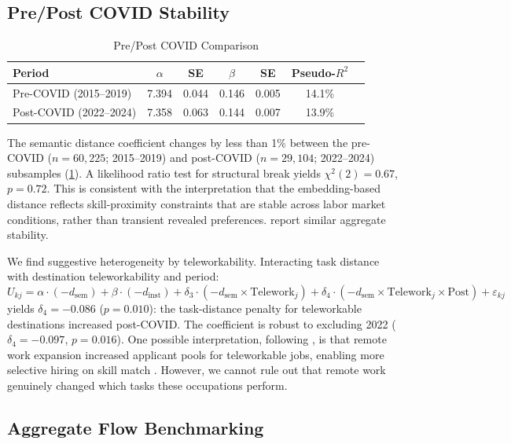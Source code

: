 \documentclass[12pt]{article}
\begin{document}
\subsection{Pre/Post COVID Stability}
\label{subsec:covid-stability}


\begin{table}[h!]
\centering
\caption{Pre/Post COVID Comparison}
\label{tab:covid-stability}
\begin{tabular}{lcccccc}
\toprule
\textbf{Period} & $\alpha$ & \textbf{SE} & $\beta$ & \textbf{SE} & \textbf{Pseudo-$R^2$} \\
\midrule
Pre-COVID (2015--2019) & 7.394 & 0.044 & 0.146 & 0.005 & 14.1\% \\
Post-COVID (2022--2024) & 7.358 & 0.063 & 0.144 & 0.007 & 13.9\% \\
\bottomrule
\end{tabular}
\end{table}


The semantic distance coefficient changes by less than 1\% between the pre-COVID ($n = 60{,}225$; 2015--2019) and post-COVID ($n = 29{,}104$; 2022--2024) subsamples (\cref{tab:covid-stability}). A likelihood ratio test for structural break yields $\chi^2(2) = 0.67$, $p = 0.72$. This is consistent with the interpretation that the embedding-based distance reflects skill-proximity constraints that are stable across labor market conditions, rather than transient revealed preferences. \citet{PizzinelliShibata2023} report similar aggregate stability.

We find suggestive heterogeneity by teleworkability. Interacting task distance with destination teleworkability \citep{DingelNeiman2020} and period:
\[
U_{kj} = \alpha \cdot (-d_{\mathrm{sem}}) + \beta \cdot (-d_{\mathrm{inst}}) + \delta_3 \cdot (-d_{\mathrm{sem}} \times \mathrm{Telework}_j) + \delta_4 \cdot (-d_{\mathrm{sem}} \times \mathrm{Telework}_j \times \mathrm{Post}) + \varepsilon_{kj}
\]
yields $\delta_4 = -0.086$ ($p = 0.010$): the task-distance penalty for teleworkable destinations increased post-COVID. The coefficient is robust to excluding 2022 ($\delta_4 = -0.097$, $p = 0.016$). One possible interpretation, following \citet{ModestinoShoagBallance2020}, is that remote work expansion increased applicant pools for teleworkable jobs, enabling more selective hiring on skill match \citep{HsuTambe2022,EmanuelHarrington2024}. However, we cannot rule out that remote work genuinely changed which tasks these occupations perform.


\subsection{Aggregate Flow Benchmarking}
\label{subsec:gravity}
\end{document}
